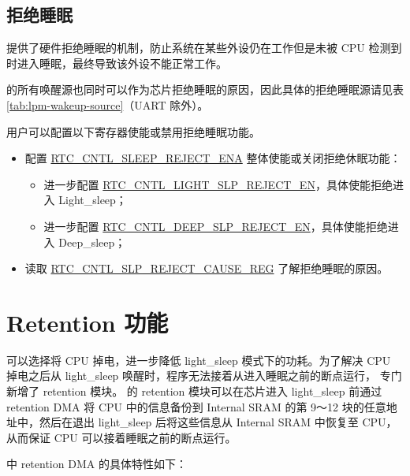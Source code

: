 \documentclass[main\_\_CN.tex]{subfiles}
\begin{document}
\subsection{拒绝睡眠}\label{sec:lpm-reject-source}

\chipname{}  提供了硬件拒绝睡眠的机制，防止系统在某些外设仍在工作但是未被 CPU 检测到时进入睡眠，最终导致该外设不能正常工作。

\chipname{} 的所有唤醒源也同时可以作为芯片拒绝睡眠的原因，因此具体的拒绝睡眠源请见表 \ref{tab:lpm-wakeup-source}（UART 除外）。

用户可以配置以下寄存器使能或禁用拒绝睡眠功能。
\begin{itemize}
    \item 配置 \hyperref[fielddesc:RTCCNTLSLEEPREJECTENA]{RTC\_CNTL\_SLEEP\_REJECT\_ENA} 整体使能或关闭拒绝休眠功能：
        \begin{itemize}
            \item 进一步配置 \hyperref[fielddesc:RTCCNTLLIGHTSLPREJECTEN]{RTC\_CNTL\_LIGHT\_SLP\_REJECT\_EN}，具体使能拒绝进入 Light\_sleep；
            \item 进一步配置 \hyperref[fielddesc:RTCCNTLDEEPSLPREJECTEN]{RTC\_CNTL\_DEEP\_SLP\_REJECT\_EN}，具体使能拒绝进入 Deep\_sleep；
        \end{itemize}
    \item 读取 \hyperref[fielddesc:RTCCNTLREJECTCAUSE]{RTC\_CNTL\_SLP\_REJECT\_CAUSE\_REG} 了解拒绝睡眠的原因。
\end{itemize}

\section{Retention 功能}
\chipname{} 可以选择将 CPU 掉电，进一步降低 light\_sleep 模式下的功耗。为了解决 CPU 掉电之后从 light\_sleep 唤醒时，程序无法接着从进入睡眠之前的断点运行，\chipname{} 专门新增了 retention 模块。
\chipname{} 的 retention 模块可以在芯片进入 light\_sleep 前通过 retention DMA 将 CPU 中的信息备份到 Internal SRAM 的第 9～12 块的任意地址中，然后在退出 light\_sleep 后将这些信息从 Internal SRAM 中恢复至 CPU，从而保证 CPU 可以接着睡眠之前的断点运行。

\chipname{} 中 retention DMA 的具体特性如下：
\end{document}
